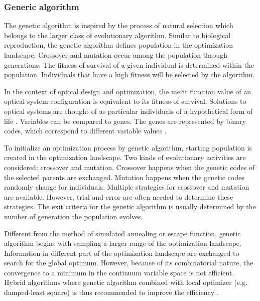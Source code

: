 \subsubsection{Generic algorithm}

The genetic algorithm is inspired by the process of natural selection which belongs to the larger class of evolutionary algorithm. Similar to biological reproduction, the genetic algorithm defines population in the optimization landscape. Crossover and mutation occur among the population through generations. The fitness of survival of a given individual is determined within the population. Individuals that have a high fitness will be selected by the algorithm.

In the context of optical design and optimization, the merit function value of an optical system configuration is equivalent to its fitness of survival. Solutions to optical systems are thought of as particular individuals of a hypothetical form of life \cite{Moore1999}. Variables can be compared to genes. The genes are represented by binary codes, which correspond to different variable values \cite{GAreview2018}. 

To initialize an optimization process by genetic algorithm, starting population is created in the optimization landscape. Two kinds of evolutionary activities are considered: crossover and mutation. Crossover happens when the genetic codes of the selected parents are exchanged. Mutation happens when the genetic codes randomly change for individuals. Multiple strategies for crossover and mutation are available. However, trial and error are often needed to determine these strategies. The exit criteria for the genetic algorithm is usually determined by the number of generation the population evolves. 

Different from the method of simulated annealing or escape function, genetic algorithm begins with sampling a larger range of the optimization landscape. Information in different part of the optimization landscape are exchanged to search for the global optimum. However, because of its combinatorial nature, the convergence to a minimum in the continuum variable space is not efficient. Hybrid algorithms where genetic algorithm combined with local optimizer (e.g. damped-least square) is thus recommended to improve the efficiency \cite{Moore1999}.

